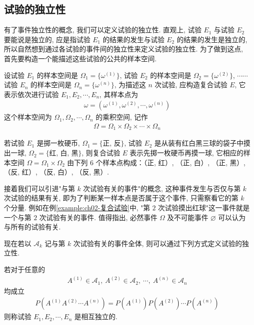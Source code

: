\documentclass[../../main.tex]{subfiles}
\begin{document}
\subsection{试验的独立性}

有了事件独立性的概念, 我们可以定义试验的独立性. 直观上, 试验 $E_1$ 与试验 $E_2$ 要能说是独立的, 应是指试验 $E_1$ 的结果的发生与试验 $E_2$ 的结果的发生是独立的, 所以自然想到通过各试验的事件间的独立性来定义试验的独立性. 为了做到这点, 首先要构造一个能描述这些试验的公共的样本空间.

设试验 $E_1$ 的样本空间是 $\Omega_1=\{\omega^{(1)}\}$, 试验 $E_2$ 的样本空间是 $\Omega_2=\{\omega^{(2)}\}$, $\cdots\cdots$ 试验 $E_n$ 的样本空间是 $\Omega_n=\{\omega^{(n)}\}$, 为描述这 $n$ 次试验, 应构造复合试验 $E$, 它表示依次进行试验 $E_1, E_2, \cdots, E_n$, 其样本点为
\begin{align*}
\omega=(\omega^{(1)},\omega^{(2)},\cdots,\omega^{(n)})
\end{align*}
这个样本空间为 $\Omega_1, \Omega_2, \cdots, \Omega_n$ 的乘积空间, 记作
\begin{align*}
\Omega=\Omega_1\times\Omega_2\times\cdots\times\Omega_n
\end{align*}

\begin{example}[掷硬币与摸球的复合试验]\label{example:ch02-复合试验}
若试验 $E_1$ 是掷一枚硬币, $\Omega_1=\{$正, 反$\}$, 试验 $E_2$ 是从装有红白黑三球的袋子中摸出一球, $\Omega_2=\{$红, 白, 黑$\}$, 则复合试验 $E$ 表示先掷一枚硬币再摸一球, 它相应的样本空间 $\Omega=\Omega_1\times\Omega_2$ 由下列 $6$ 个样本点构成：（正, 红）, （正, 白）, （正, 黑）, （反, 红）, （反, 白）, （反, 黑）.
\end{example}

接着我们可以引进"与第 $k$ 次试验有关的事件"的概念, 这种事件发生与否仅与第 $k$ 次试验的结果有关, 即为了判断某一样本点是否属于这个事件, 只需察看它的第 $k$ 个分量. 例如在例\ref{example:ch02-复合试验}中, "第 $2$ 次试验摸出红球"这一事件就是一个与第 $2$ 次试验有关的事件. 值得指出, 必然事件 $\Omega$ 及不可能事件 $\varnothing$ 可以认为与所有的试验有关.

现在若以 $\mathscr{A}_k$ 记与第 $k$ 次试验有关的事件全体, 则可以通过下列方式定义试验的独立性.

\begin{definition}[试验的独立性]\label{definition:ch02-试验独立性}
若对于任意的
\begin{align*}
A^{(1)}\in\mathscr{A}_1,\ A^{(2)}\in\mathscr{A}_2,\ \cdots,\ A^{(n)}\in\mathscr{A}_n
\end{align*}
均成立
\begin{align*}
P(A^{(1)}A^{(2)}\cdots A^{(n)})=P(A^{(1)})P(A^{(2)})\cdots P(A^{(n)})
\end{align*}
则称试验 $E_1, E_2, \cdots, E_n$ 是相互独立的.
\end{definition}
\end{document}
